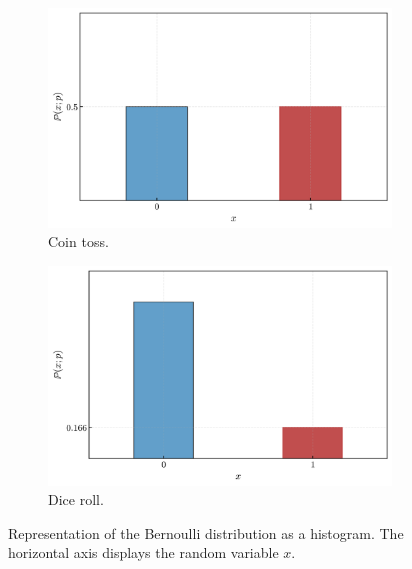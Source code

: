 \documentclass{book}
\begin{document}
\begin{figure}[ht]
    \centering
    \begin{subfigure}[b]{0.48\textwidth}
        \centering
        \includegraphics[width=\textwidth, height=0.7\textwidth]{figures/chapter2/bernoulli_1.png}
        \caption{Coin toss.}
        \label{fig:bernoulli1}
    \end{subfigure}
    \hfill
    \begin{subfigure}[b]{0.48\textwidth}
        \centering
        \includegraphics[width=\textwidth, height=0.7\textwidth]{figures/chapter2/bernoulli_2.png}
        \caption{Dice roll.}
        \label{fig:bernoulli2}
    \end{subfigure}
    \caption{Representation of the Bernoulli distribution as a histogram. The horizontal axis displays the random variable $x$.}
    \label{fig:bernoulli_comparison}
\end{figure}
\end{document}
